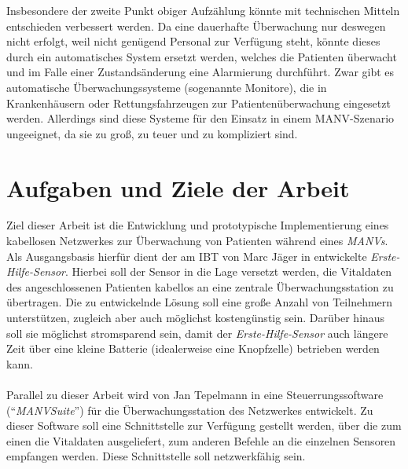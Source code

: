Insbesondere der zweite Punkt obiger Aufzählung könnte mit technischen Mitteln entschieden
verbessert werden. Da eine dauerhafte Überwachung nur deswegen nicht erfolgt, weil nicht genügend
Personal zur Verfügung steht, könnte dieses durch ein automatisches System ersetzt werden, welches
die Patienten überwacht und im Falle einer Zustandsänderung eine Alarmierung durchführt.
Zwar gibt es automatische Überwachungssysteme (sogenannte Monitore), die in Krankenhäusern oder
Rettungsfahrzeugen zur Patientenüberwachung eingesetzt werden. Allerdings sind diese Systeme für
den Einsatz in einem MANV-Szenario ungeeignet, da sie zu groß, zu teuer und zu kompliziert sind.

\section{Aufgaben und Ziele der Arbeit}
Ziel dieser Arbeit ist die Entwicklung und prototypische Implementierung eines
kabellosen Netzwerkes zur Überwachung von Patienten während eines \emph{MANVs}. Als
Ausgangsbasis hierfür dient der am IBT von Marc Jäger in \cite{Marc}
entwickelte \emph{Erste-Hilfe-Sensor}. Hierbei soll der Sensor in die Lage versetzt
werden, die Vitaldaten des angeschlossenen Patienten kabellos an eine zentrale
Überwachungsstation zu übertragen. Die zu entwickelnde Lösung soll eine
große Anzahl von Teilnehmern unterstützen, zugleich aber auch möglichst kostengünstig
sein. Darüber hinaus soll sie möglichst stromsparend sein, damit der \emph{Erste-Hilfe-Sensor}
auch längere Zeit über eine kleine Batterie (idealerweise eine Knopfzelle) betrieben 
werden kann.\\
\\
Parallel zu dieser Arbeit wird von Jan Tepelmann in \cite{Jan} eine 
Steuerrungssoftware ("`\emph{MANVSuite}"') für die Überwachungsstation des Netzwerkes 
entwickelt. Zu dieser Software soll eine Schnittstelle zur Verfügung gestellt werden, über die zum einen
die Vitaldaten ausgeliefert, zum anderen Befehle an die einzelnen Sensoren empfangen 
werden. Diese Schnittstelle soll netzwerkfähig sein. 

